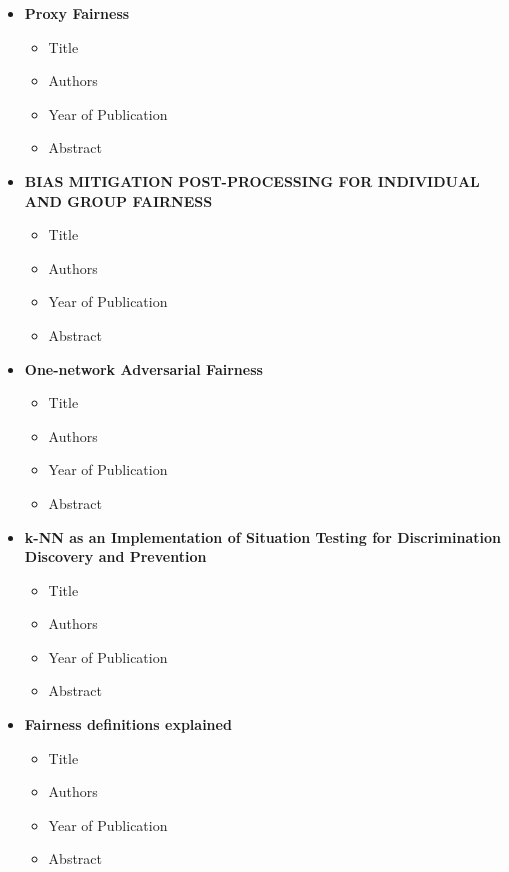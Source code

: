 \documentclass{article}
\begin{document}
\begin{itemize}
        \item \textbf{Proxy Fairness}
        \begin{itemize}
            \item Title
            \item Authors
            \item Year of Publication
            \item Abstract
        \end{itemize}
        
        \item \textbf{BIAS MITIGATION POST-PROCESSING FOR INDIVIDUAL AND GROUP FAIRNESS}
        \begin{itemize}
            \item Title
            \item Authors
            \item Year of Publication
            \item Abstract
        \end{itemize}
        
        \item \textbf{One-network Adversarial Fairness}
        \begin{itemize}
            \item Title
            \item Authors
            \item Year of Publication
            \item Abstract
        \end{itemize}
        
        \item \textbf{k-NN as an Implementation of Situation Testing for Discrimination Discovery and Prevention}
        \begin{itemize}
            \item Title
            \item Authors
            \item Year of Publication
            \item Abstract
        \end{itemize}
        
        \item \textbf{Fairness definitions explained}
        \begin{itemize}
            \item Title
            \item Authors
            \item Year of Publication
            \item Abstract
        \end{itemize}
        

\end{itemize}
\end{document}

